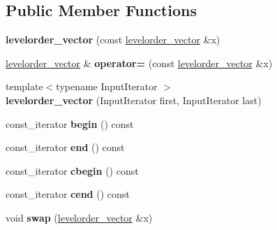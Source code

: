 \subsection*{Public Member Functions}
\begin{DoxyCompactItemize}
\item 
\hypertarget{classlevelorder__vector_a6960833289a781ec6d56216c38d3b13b}{{\bfseries levelorder\+\_\+vector} (const \hyperlink{classlevelorder__vector}{levelorder\+\_\+vector} \&x)}\label{classlevelorder__vector_a6960833289a781ec6d56216c38d3b13b}

\item 
\hypertarget{classlevelorder__vector_ad7d17bbade58e06cef0b1c52b456bd1c}{\hyperlink{classlevelorder__vector}{levelorder\+\_\+vector} \& {\bfseries operator=} (const \hyperlink{classlevelorder__vector}{levelorder\+\_\+vector} \&x)}\label{classlevelorder__vector_ad7d17bbade58e06cef0b1c52b456bd1c}

\item 
\hypertarget{classlevelorder__vector_afae5b9bc9acafd65738acbb0be43e09e}{{\footnotesize template$<$typename Input\+Iterator $>$ }\\{\bfseries levelorder\+\_\+vector} (Input\+Iterator first, Input\+Iterator last)}\label{classlevelorder__vector_afae5b9bc9acafd65738acbb0be43e09e}

\item 
\hypertarget{classlevelorder__vector_a99ad7144ea654480177bd3b4c91fd602}{const\+\_\+iterator {\bfseries begin} () const }\label{classlevelorder__vector_a99ad7144ea654480177bd3b4c91fd602}

\item 
\hypertarget{classlevelorder__vector_a469ea8a51923cd674f42703b8a10b336}{const\+\_\+iterator {\bfseries end} () const }\label{classlevelorder__vector_a469ea8a51923cd674f42703b8a10b336}

\item 
\hypertarget{classlevelorder__vector_a6f080dd85f82fe429da7957518d81173}{const\+\_\+iterator {\bfseries cbegin} () const }\label{classlevelorder__vector_a6f080dd85f82fe429da7957518d81173}

\item 
\hypertarget{classlevelorder__vector_a42f7fee4cbad60eb58ac2b6ed8fad559}{const\+\_\+iterator {\bfseries cend} () const }\label{classlevelorder__vector_a42f7fee4cbad60eb58ac2b6ed8fad559}

\item 
\hypertarget{classlevelorder__vector_a3d8690970562fde45a9b406a4bfe9908}{void {\bfseries swap} (\hyperlink{classlevelorder__vector}{levelorder\+\_\+vector} \&x)}\label{classlevelorder__vector_a3d8690970562fde45a9b406a4bfe9908}


\end{DoxyCompactItemize}
